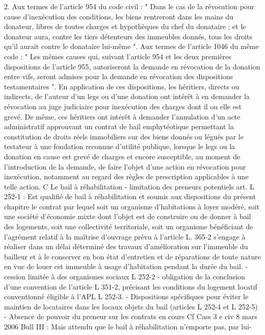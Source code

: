 \documentclass[11pt,a4paper]{report}
\begin{document}
	2. Aux termes de l'article 954 du code civil : " Dans le cas de la révocation pour cause d'inexécution des
	conditions, les biens rentreront dans les mains du donateur, libres de toutes charges et hypothèques du chef du
	donataire ; et le donateur aura, contre les tiers détenteurs des immeubles donnés, tous les droits qu'il aurait
	contre le donataire lui-même ". Aux termes de l'article 1046 du même code : " Les mêmes causes qui, suivant
	l'article 954 et les deux premières dispositions de l'article 955, autoriseront la demande en révocation de la
	donation entre vifs, seront admises pour la demande en révocation des dispositions testamentaires ". En
	application de ces dispositions, les héritiers, directs ou indirects, de l'auteur d'un legs ou d'une donation ont
	intérêt à en demander la révocation au juge judiciaire pour inexécution des charges dont il ou elle est grevé. De
	même, ces héritiers ont intérêt à demander l'annulation d'un acte administratif approuvant un contrat de bail
	emphytéotique permettant la constitution de droits réels immobiliers sur des biens donnés ou légués par le
	testateur à une fondation reconnue d'utilité publique, lorsque le legs ou la donation en cause est grevé de
	charges et encore susceptible, au moment de l'introduction de la demande, de faire l'objet d'une action en
	révocation pour inexécution, notamment au regard des règles de prescription applicables à une telle action.
	C Le bail à réhabilitation
	- limitation des preneurs potentiels art. L 252-1 : Est qualifié de bail à réhabilitation et soumis aux
	dispositions du présent chapitre le contrat par lequel soit un organisme d'habitations à loyer modéré, soit une
	société d'économie mixte dont l'objet est de construire ou de donner à bail des logements, soit une collectivité
	territoriale, soit un organisme bénéficiant de l'agrément relatif à la maîtrise d'ouvrage prévu à l'article L. 365-2
	s'engage à réaliser dans un délai déterminé des travaux d'amélioration sur l'immeuble du bailleur et à le
	conserver en bon état d'entretien et de réparations de toute nature en vue de louer cet immeuble à usage
	d'habitation pendant la durée du bail.
	- cession limitée à des organismes sociaux L 252-2
	- obligation de la conclusion d’une convention de l’article L 351-2, précisant les conditions du logement
	locatif conventionné éligible à l’APL L 252-3.
	- Dispositions spécifiques pour éviter le maintien de locataires dans les locaux objets du bail (articles L
	252-4 et L 252-5)
	- Absence de pouvoir du preneur sur les contrats en cours
	Cf Cass 3 e civ 8 mars 2006 Bull III  : Mais attendu que le bail à réhabilitation n'emporte pas, par lui-
\end{document}
